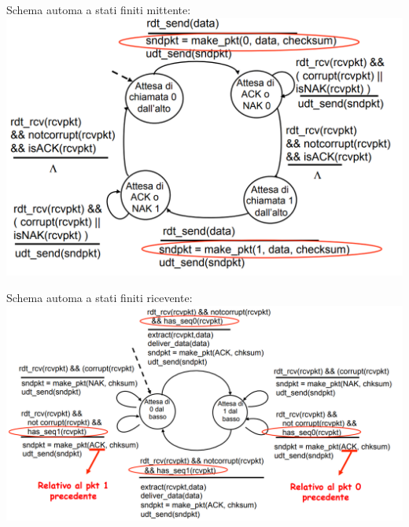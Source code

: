 Schema automa a stati finiti mittente: \newline
\includegraphics[width=\textwidth]{./img/rdt2.1mit.png}

Schema automa a stati finiti ricevente: \newline
\includegraphics[width=\textwidth]{./img/rdt2.1ric.png}

